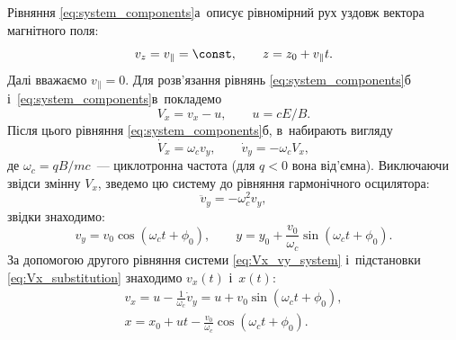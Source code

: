 Рівняння \eqref{eq:system_components}а~описує рівномірний рух уздовж вектора магнітного поля:
\begin{equation}\label{eq:vz_motion}
	v_z = v_{\parallel} = \const, \qquad z = z_0 + v_{\parallel}t.
\end{equation}
Далі вважаємо $v_{\parallel} = 0$. Для розв'язання рівнянь \eqref{eq:system_components}б і~\eqref{eq:system_components}в~покладемо
\begin{equation}\label{eq:Vx_substitution}
	V_x = v_x - u, \qquad u = cE/B.
\end{equation}
Після цього рівняння \eqref{eq:system_components}б, в~набирають вигляду
\begin{equation}\label{eq:Vx_vy_system}
	\dot{V}_x = \omega_c v_y, \qquad \dot{v}_y = -\omega_c V_x,
\end{equation}
де $\omega_c = qB/mc$~--- циклотронна частота (для $q<0$ вона від'ємна). Виключаючи звідси змінну $V_x$, зведемо цю систему до рівняння гармонічного осцилятора:
\begin{equation}\label{eq:harmonic_oscillator}
	\ddot{v}_y = -\omega_c^2 v_y,
\end{equation}
звідки знаходимо:
\begin{equation}\label{eq:vy_solution}
	v_y = v_0 \cos(\omega_c t + \phi_0), \qquad
	y = y_0 + \frac{v_0}{\omega_c} \sin(\omega_c t + \phi_0).
\end{equation}
За допомогою другого рівняння системи \eqref{eq:Vx_vy_system} і~підстановки \eqref{eq:Vx_substitution} знаходимо $v_x(t)$ і~$x(t)$:
\begin{equation}\label{eq:vx_x_solution}
	\begin{gathered}
		v_x = u - \frac{1}{\omega_c}\dot{v}_y = u + v_0 \sin(\omega_c t + \phi_0), \\
		x = x_0 + ut - \frac{v_0}{\omega_c} \cos(\omega_c t + \phi_0).
	\end{gathered}
\end{equation}
